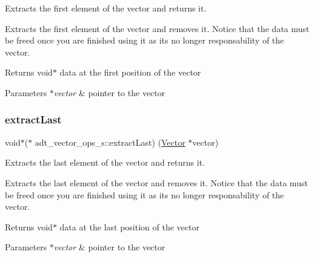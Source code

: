 Extracts the first element of the vector and returns it. 

Extracts the first element of the vector and removes it. Notice that the data must be freed once you are finished using it as it\textquotesingle{}s no longer responsability of the vector.

\begin{DoxyReturn}{Returns}
void$\ast$ data at the first position of the vector 
\end{DoxyReturn}

\begin{DoxyParams}{Parameters}
{\em $\ast$vector} & pointer to the vector \\
\hline
\end{DoxyParams}
\mbox{\label{structadt__vector__ops__s_a1826b67cd6d282ab6aa71cb83814f432}} 
\subsubsection{\texorpdfstring{extract\+Last}{extractLast}}
{\footnotesize\ttfamily void$\ast$($\ast$ adt\+\_\+vector\+\_\+ops\+\_\+s\+::extract\+Last) (\hyperlink{structadt__vector__s}{Vector} $\ast$vector)}



Extracts the last element of the vector and returns it. 

Extracts the last element of the vector and removes it. Notice that the data must be freed once you are finished using it as it\textquotesingle{}s no longer responsability of the vector.

\begin{DoxyReturn}{Returns}
void$\ast$ data at the last position of the vector 
\end{DoxyReturn}

\begin{DoxyParams}{Parameters}
{\em $\ast$vector} & pointer to the vector \\
\hline
\end{DoxyParams}
\mbox{\label{structadt__vector__ops__s_a5448d839fe589336e1ceefed76812f13}} 
